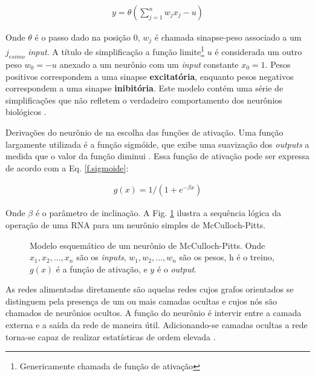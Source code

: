 \documentclass[journal, a4paper]{IEEEtran}
\begin{document}
\begin{eqnarray}
y=\theta \left( \sum^{n}_{j=1} w_{j} x_{j} -u \right)
\label{Eq.neuronio-McCulloch}
\end{eqnarray}

Onde $\theta$ é o passo dado na posição $0$, $w_{j}$ é chamada sinapse-peso associado a um $j_{esimo}$ \textit{input}. A título de simplificação a função limite\footnote{Genericamente chamada de função de ativação} $u$ é considerada um outro peso $w_{0}=-u$ anexado a um neurônio com um \textit{input} constante $x_{0}=1$. Pesos positivos correspondem a uma sinapse \textbf{excitatória}, enquanto pesos negativos correspondem a uma sinapse \textbf{inibitória}. Este modelo contém uma série de simplificações que não refletem o verdadeiro comportamento dos neurônios biológicos \citep{Mao1996}.  

Derivações do neurônio de \citet{McCulloch1943} na escolha das funções de ativação. Uma função largamente utilizada é a função sigmóide, que exibe uma suavização dos \textit{outputs} a medida que o valor da função diminui \citep{Mao1996,Misra2010}. Essa função de ativação pode ser expressa de acordo com a Eq. \ref{f.sigmoide}:

\begin{eqnarray}
g(x)=1/(1+e^{-\beta x})
\label{f.sigmoide}
\end{eqnarray}

Onde $\beta$ é o parâmetro de inclinação. A Fig. \ref{Esquematico de McCulloch} ilustra a sequência lógica da operação de uma RNA para um neurônio simples de McCulloch-Pitts. 
\\
\begin{figure}[ht]
	\centering
	\setlength{\fboxsep}{8pt}
	\setlength{\fboxrule}{0.1pt}
	\caption{Modelo esquemático de um neurônio de McCulloch-Pitts. Onde $x_{1}, x_{2}, ..., x_{n}$ são os \textit{inputs}, $w_{1}, w_{2}, ..., w_{n}$ são os pesos, h é o treino, $g(x)$ é a função de ativação, e $y$ é o \textit{output}.}
	\label{Esquematico de McCulloch}
\end{figure}

As redes alimentadas diretamente são aquelas redes cujos grafos orientados se distinguem pela presença de um ou mais camadas ocultas e cujos nós são chamados de neurônios ocultos. A função do neurônio é intervir entre a camada externa e a saída da rede de maneira útil. Adicionando-se camadas ocultas a rede torna-se capaz de realizar estatísticas de ordem elevada \citep{Haykin1999}.
\end{document}
